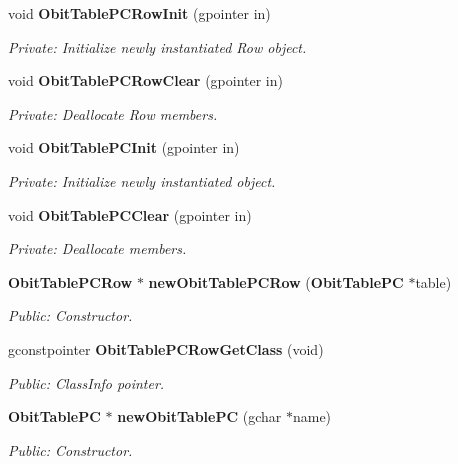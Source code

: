 \begin{CompactItemize}
\item 
void {\bf Obit\-Table\-PCRow\-Init} (gpointer in)
\begin{CompactList}\small\item\em Private: Initialize newly instantiated Row object. \item\end{CompactList}\item 
void {\bf Obit\-Table\-PCRow\-Clear} (gpointer in)
\begin{CompactList}\small\item\em Private: Deallocate Row members. \item\end{CompactList}\item 
void {\bf Obit\-Table\-PCInit} (gpointer in)
\begin{CompactList}\small\item\em Private: Initialize newly instantiated object. \item\end{CompactList}\item 
void {\bf Obit\-Table\-PCClear} (gpointer in)
\begin{CompactList}\small\item\em Private: Deallocate members. \item\end{CompactList}\item 
{\bf Obit\-Table\-PCRow} $\ast$ {\bf new\-Obit\-Table\-PCRow} ({\bf Obit\-Table\-PC} $\ast$table)
\begin{CompactList}\small\item\em Public: Constructor. \item\end{CompactList}\item 
gconstpointer {\bf Obit\-Table\-PCRow\-Get\-Class} (void)
\begin{CompactList}\small\item\em Public: Class\-Info pointer. \item\end{CompactList}\item 
{\bf Obit\-Table\-PC} $\ast$ {\bf new\-Obit\-Table\-PC} (gchar $\ast$name)
\begin{CompactList}\small\item\em Public: Constructor. \item\end{CompactList}\item 

\end{CompactItemize}
